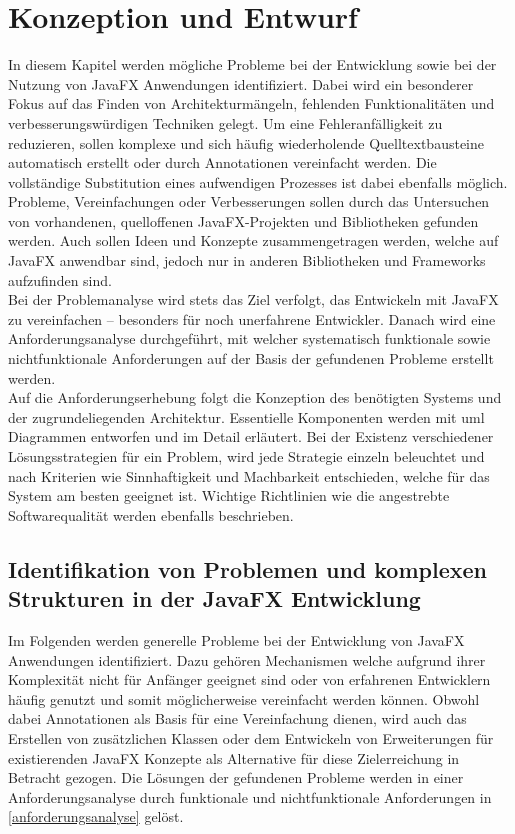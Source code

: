 \chapter{Konzeption und Entwurf}
\label{konzeption_und_entwurf}
In diesem Kapitel werden mögliche Probleme bei der Entwicklung sowie bei der Nutzung von JavaFX Anwendungen identifiziert. Dabei wird ein besonderer Fokus auf das Finden von Architekturmängeln, fehlenden Funktionalitäten und verbesserungswürdigen Techniken gelegt. Um eine Fehleranfälligkeit zu reduzieren, sollen komplexe und sich häufig wiederholende Quelltextbausteine automatisch erstellt oder durch Annotationen vereinfacht werden. Die vollständige Substitution eines aufwendigen Prozesses ist dabei ebenfalls möglich. Probleme, Vereinfachungen oder Verbesserungen sollen durch das Untersuchen von vorhandenen, quelloffenen JavaFX-Projekten und Bibliotheken gefunden werden. Auch sollen Ideen und Konzepte zusammengetragen werden, welche auf JavaFX anwendbar sind, jedoch nur in anderen Bibliotheken und Frameworks aufzufinden sind. \\
Bei der Problemanalyse wird stets das Ziel verfolgt, das Entwickeln mit JavaFX zu vereinfachen -- besonders für noch unerfahrene Entwickler. Danach wird eine Anforderungsanalyse durchgeführt, mit welcher systematisch funktionale sowie nichtfunktionale Anforderungen auf der Basis der gefundenen Probleme erstellt werden. \\
Auf die Anforderungserhebung folgt die Konzeption des benötigten Systems und der zugrundeliegenden Architektur. Essentielle Komponenten werden mit \ac{uml} Diagrammen entworfen und im Detail erläutert. Bei der Existenz verschiedener Lösungsstrategien für ein Problem, wird jede Strategie einzeln beleuchtet und nach Kriterien wie Sinnhaftigkeit und Machbarkeit entschieden, welche für das System am besten geeignet ist. Wichtige Richtlinien wie die angestrebte Softwarequalität werden ebenfalls beschrieben.

\section{Identifikation von Problemen und komplexen Strukturen in der JavaFX Entwicklung}
\label{problemanalyse}
Im Folgenden werden generelle Probleme bei der Entwicklung von JavaFX Anwendungen identifiziert. Dazu gehören Mechanismen welche aufgrund ihrer Komplexität nicht für Anfänger geeignet sind oder von erfahrenen Entwicklern häufig genutzt und somit möglicherweise vereinfacht werden können. Obwohl dabei Annotationen als Basis für eine Vereinfachung dienen, wird auch das Erstellen von zusätzlichen Klassen oder dem Entwickeln von Erweiterungen für existierenden JavaFX Konzepte als Alternative für diese Zielerreichung in Betracht gezogen. Die Lösungen der gefundenen Probleme werden in einer Anforderungsanalyse durch funktionale und nichtfunktionale Anforderungen in \autoref{anforderungsanalyse} gelöst.
